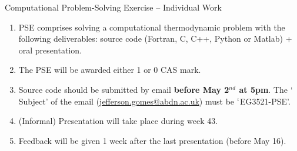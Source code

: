 


\begin{center}
{\Large Computational Problem-Solving Exercise -- Individual Work}
\end{center}

\begin{enumerate}
%
\item PSE comprises solving a computational thermodynamic problem with the following deliverables: source code (Fortran, C, C++, Python or Matlab) + oral presentation. 
%
\item The PSE will be awarded either 1 or 0 CAS mark.
%
\item Source code should be submitted by email {\bf before May 2$^{nd}$ at 5pm}.  The $\lq$Subject' of the email (\href{mailto:jefferson.gomes@abdn.ac.uk}{jefferson.gomes@abdn.ac.uk}) must be $\lq$EG3521-PSE'.
%
\item (Informal) Presentation will take place during week 43.
%
\item Feedback will be given 1 week after the last presentation (before May 16).
\end{enumerate}
%



